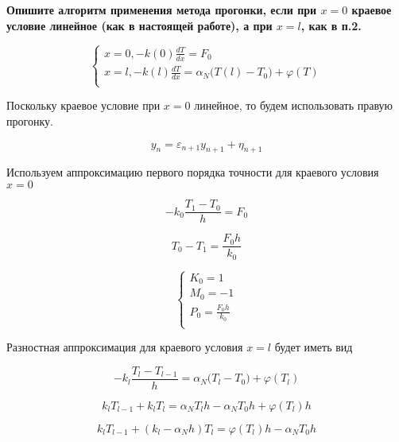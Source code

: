 \textbf{Опишите алгоритм применения метода прогонки, если при $x=0$ краевое условие линейное (как в настоящей работе), а при $x=l$, как в п.2.}


\begin{equation*}
    \begin{cases}
        x = 0, -k(0) \frac{dT}{dx} = F_0 \\
        x = l, -k(l) \frac{dT}{dx} = \alpha_N\big(T(l) - T_0\big) + \varphi(T) \\
    \end{cases}
\end{equation*}


Поскольку краевое условие при $x=0$ линейное, то будем использовать правую прогонку.

\begin{equation*}
    y_n = \varepsilon_{n+1} y_{n+1} + \eta_{n+1}
\end{equation*}

Используем аппроксимацию первого порядка точности для краевого условия $x=0$

\begin{equation*}
    -k_0 \frac{T_1 - T_0}{h} = F_0
\end{equation*}

\begin{equation*}
    T_0 - T_1 = \frac{F_0h}{k_0}
\end{equation*}

\begin{equation*}
    \begin{cases}
        K_0 = 1 \\
        M_0 = -1 \\
        P_0 = \frac{F_0h}{k_0} \\
    \end{cases}
\end{equation*}

Разностная аппроксимация для краевого условия $x=l$ будет иметь вид

\begin{equation*}
    -k_l \frac{T_l - T_{l-1}}{h} = \alpha_N\big(T_l - T_0\big) + \varphi(T_l)
\end{equation*}

\begin{equation*}
    k_lT_{l-1} + k_lT_l = \alpha_N T_l h - \alpha_NT_0 h + \varphi(T_l) h
\end{equation*}

\begin{equation*}
    k_lT_{l-1} + (k_l - \alpha_Nh)T_l = \varphi(T_l)h - \alpha_NT_0h
\end{equation*}

